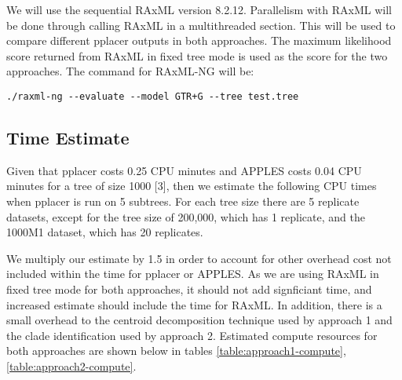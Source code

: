 \documentclass[10pt]{article}
\begin{document}
We will use the sequential RAxML version 8.2.12. Parallelism with RAxML
will be done through calling RAxML in a multithreaded section. This will
be used to compare different pplacer outputs in both approaches. The
maximum likelihood score returned from RAxML in fixed tree mode is used
as the score for the two approaches. The command for RAxML-NG will be:

\begin{verbatim}
./raxml-ng --evaluate --model GTR+G --tree test.tree
\end{verbatim}

\subsection{Time Estimate}

Given that pplacer costs 0.25 CPU minutes and APPLES costs 0.04 CPU
minutes for a tree of size 1000 {[}3{]}, then we estimate the following
CPU times when pplacer is run on 5 subtrees. For each tree size there
are 5 replicate datasets, except for the tree size of 200,000, which has
1 replicate, and the 1000M1 dataset, which has 20 replicates.

We multiply our estimate by 1.5 in order to account for other overhead
cost not included within the time for pplacer or APPLES. As we are using
RAxML in fixed tree mode for both approaches, it should not add
signficiant time, and increased estimate should include the time for
RAxML. In addition, there is a small overhead to the centroid
decomposition technique used by approach 1 and the clade identification
used by approach 2. Estimated compute resources for both approaches are
shown below in tables \ref{table:approach1-compute},
\ref{table:approach2-compute}.
\end{document}
